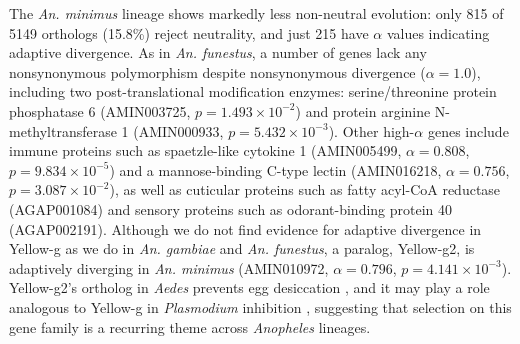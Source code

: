 The \textit{An. minimus} lineage shows markedly less non-neutral evolution:
only 815 of 5149 orthologs (15.8\%) reject neutrality,
and just 215 have $\alpha$ values indicating adaptive divergence.
As in \textit{An. funestus}, a number of genes lack any nonsynonymous polymorphism
despite nonsynonymous divergence ($\alpha = 1.0$),
including two post-translational modification enzymes:
serine/threonine protein phosphatase 6
(AMIN003725, $p = 1.493\times10^{-2}$)
and protein arginine N-methyltransferase 1
(AMIN000933, $p = 5.432\times10^{-3}$).
Other high-$\alpha$ genes include immune proteins
such as spaetzle-like cytokine 1
(AMIN005499, $\alpha = 0.808$, $p = 9.834\times10^{-5}$)
and a mannose-binding C-type lectin
(AMIN016218, $\alpha = 0.756$, $p = 3.087\times10^{-2}$),
as well as cuticular proteins such as fatty acyl-CoA reductase (AGAP001084)
and sensory proteins such as odorant-binding protein 40 (AGAP002191).
Although we do not find evidence for adaptive divergence in Yellow-g
as we do in \textit{An. gambiae} and \textit{An. funestus},
a paralog, Yellow-g2, is adaptively diverging in \textit{An. minimus}
(AMIN010972, $\alpha = 0.796$, $p = 4.141\times10^{-3}$).
Yellow-g2's ortholog in \textit{Aedes} prevents egg desiccation
\citep{yellowg_desiccation},
and it may play a role analogous to Yellow-g
in \textit{Plasmodium} inhibition \citep{yellowg_plasmodium},
suggesting that selection on this gene family
is a recurring theme across \textit{Anopheles} lineages.

